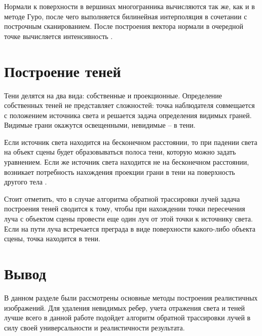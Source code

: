 Нормали к поверхности в вершинах многогранника вычисляются так же, как и в методе Гуро, после чего выполняется билинейная интерполяция в сочетании с построчным сканированием. После построения вектора нормали в очередной точке вычисляется интенсивность \cite{lit5}.

\section{Построение теней}
Тени делятся на два вида: собственные и проекционные. Определение собственных теней не представляет сложностей: точка наблюдателя совмещается с положением источника света и решается задача определения видимых граней. Видимые грани окажутся освещенными, невидимые -- в тени.

Если источник света находится на бесконечном расстоянии, то при падении света на объект сцены будет образовываться полоса тени, которую можно задать уравнением. Если же источник света находится не на бесконечном расстоянии, возникает потребность нахождения проекции грани в тени на поверхность другого тела \cite{lit6}.

Стоит отметить, что в случае алгоритма обратной трассировки лучей задача построения теней сводится к тому, чтобы при нахождении точки пересечения луча с объектом сцены провести еще один луч от этой точки к источнику света. Если на пути луча встречается преграда в виде поверхности какого-либо объекта сцены, точка находится в тени.


\section*{Вывод}

В данном разделе были рассмотрены основные методы построения реалистичных изображений. Для удаления невидимых ребер, учета отражения света и теней лучше всего в данной работе подойдет алгоритм обратной трассировки лучей в силу своей универсальности и реалистичности результата.

\clearpage
